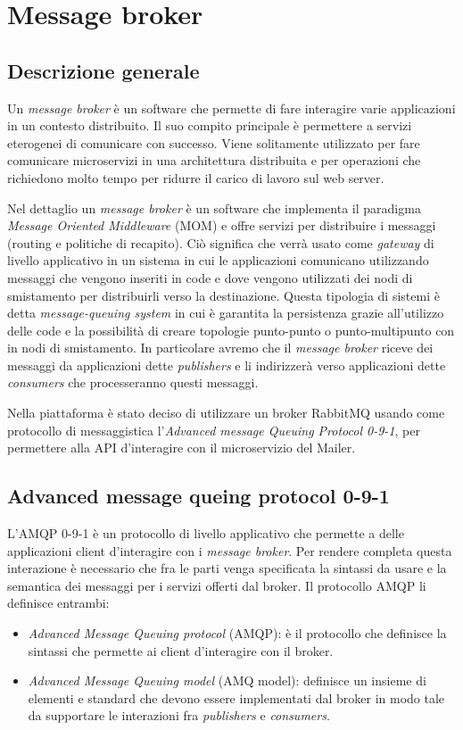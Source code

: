 \section{Message broker}
\subsection{Descrizione generale}
Un \textit{message broker} è un software che permette di fare interagire varie applicazioni in
un contesto distribuito. Il suo compito principale è permettere a servizi eterogenei di comunicare con successo.
Viene solitamente utilizzato per fare comunicare microservizi in una architettura distribuita
e per operazioni che richiedono molto tempo per ridurre il carico di lavoro sul web server.

Nel dettaglio un \textit{message broker} è un software che implementa il paradigma \textit{Message Oriented Middleware} (MOM) e offre servizi per distribuire i messaggi (routing e politiche di recapito).
Ciò significa che verrà usato come \textit{gateway} di livello applicativo in un sistema in cui le applicazioni comunicano utilizzando messaggi
che vengono inseriti in code e dove vengono utilizzati dei nodi di smistamento per distribuirli verso la destinazione.
Questa tipologia di sistemi è detta \textit{message-queuing system}\cite{MessageBroker-Book} in cui è garantita la persistenza
grazie all'utilizzo delle code e la possibilità di creare topologie punto-punto o punto-multipunto con in nodi di smistamento.
In particolare avremo che il \textit{message broker} riceve dei messaggi da applicazioni dette \textit{publishers} e li indirizzerà verso applicazioni dette \textit{consumers} che processeranno questi messaggi.

Nella piattaforma è stato deciso di utilizzare un broker RabbitMQ\cite{rabbitMQ} usando come protocollo di messaggistica l'\textit{Advanced message Queuing Protocol 0-9-1}\cite{amqp},
per permettere alla API d'interagire con il microservizio del Mailer.

\subsection{Advanced message queing protocol 0-9-1}
L'AMQP 0-9-1 è un protocollo di livello applicativo che permette a delle applicazioni client d'interagire con i \textit{message broker}.
Per rendere completa questa interazione è necessario che fra le parti venga specificata la sintassi da usare e la semantica dei messaggi per i servizi offerti dal broker.
Il protocollo AMQP li definisce entrambi:
\begin{itemize}
    \item \textit{Advanced Message Queuing protocol} (AMQP): è il protocollo che definisce la sintassi che permette ai client d'interagire con il broker.
    \item \textit{Advanced Message Queuing model} (AMQ model): definisce un insieme di elementi e standard che devono essere implementati dal broker in modo tale da supportare le interazioni fra \textit{publishers} e \textit{consumers}.
\end{itemize}

